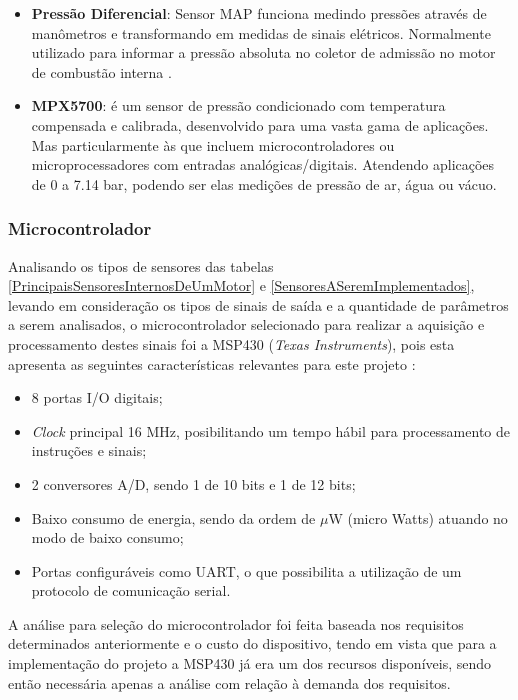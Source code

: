 \begin{itemize}
	\item \textbf{Pressão Diferencial}: 
	Sensor MAP funciona medindo pressões através de manômetros e transformando em medidas de sinais elétricos. Normalmente utilizado para informar a pressão absoluta no coletor de admissão no motor de combustão interna \cite{vdo01}.
	
	\item \textbf{MPX5700}: é um sensor de pressão condicionado com temperatura compensada e calibrada, desenvolvido para uma vasta gama de aplicações. Mas particularmente às que incluem microcontroladores ou microprocessadores com entradas analógicas/digitais. Atendendo aplicações de 0 a 7.14 bar, podendo ser elas medições de pressão de ar, água ou vácuo\cite{freescaler01}.
\end{itemize}

\subsubsection{Microcontrolador}

Analisando os tipos de sensores das tabelas \ref{PrincipaisSensoresInternosDeUmMotor} e \ref{SensoresASeremImplementados}, levando em consideração os tipos de sinais de saída e a quantidade de parâmetros a serem analisados, o microcontrolador selecionado para realizar a aquisição e processamento destes sinais foi a MSP430 (\textit{Texas Instruments}), pois esta apresenta as seguintes características relevantes para este projeto \cite{texas01}:

\begin{itemize}
	\item 8 portas I/O digitais;
	\item \textit{Clock} principal 16 MHz, posibilitando um tempo hábil para processamento de instruções e sinais;
	\item 2 conversores A/D, sendo 1 de 10 bits e 1 de 12 bits;
	\item Baixo consumo de energia, sendo da ordem de $\mu$W (micro Watts) atuando no modo de baixo consumo;
	\item Portas configuráveis como UART, o que possibilita a utilização de um protocolo de comunicação serial.
\end{itemize}

A análise para seleção do microcontrolador foi feita baseada nos requisitos determinados anteriormente e o custo do dispositivo, tendo em vista que para a implementação do projeto a MSP430 já era um dos recursos disponíveis, sendo então necessária apenas a análise com relação à demanda dos requisitos. 

